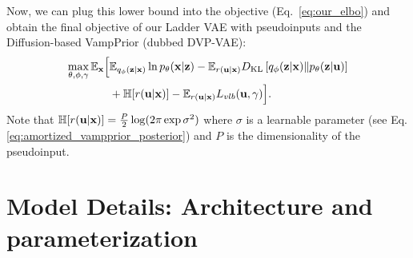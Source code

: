 Now, we can plug this lower bound into the objective (Eq.~\ref{eq:our_elbo}) and obtain the final objective of our Ladder VAE with pseudoinputs and the Diffusion-based VampPrior (dubbed DVP-VAE):
\begin{equation}\label{eq:5_dvp_our_elbo_final}
\begin{aligned}
    \max_{\theta, \phi, \gamma}\E_{\rvx} \Bigl[
     &\E_{\Enc{\rvz}{\rvx}} \ln \Dec{\rvx}{\rvz} 
     - \E_{r(\rvu|\rvx)}\KL{q_{\phi}(\rvz|\rvx)}{p_{\theta}(\rvz|\rvu)} \\
     &+ \mathbb{H}[r(\rvu|\rvx)] 
     - \E_{r(\rvu|\rvx)} L_{vlb}(\rvu, \gamma)\Bigr].
\end{aligned}
\end{equation}
Note that $\mathbb{H}[r({\mathbf{u}}|{\mathbf{x}})] = \frac{P}{2}\log(2\pi \exp \sigma^2)$ where $\sigma$ is a learnable parameter (see Eq. \ref{eq:amortized_vampprior_posterior}) and $P$ is the dimensionality of the pseudoinput.

\section{Model Details: Architecture and parameterization} \label{sec:architecture}

